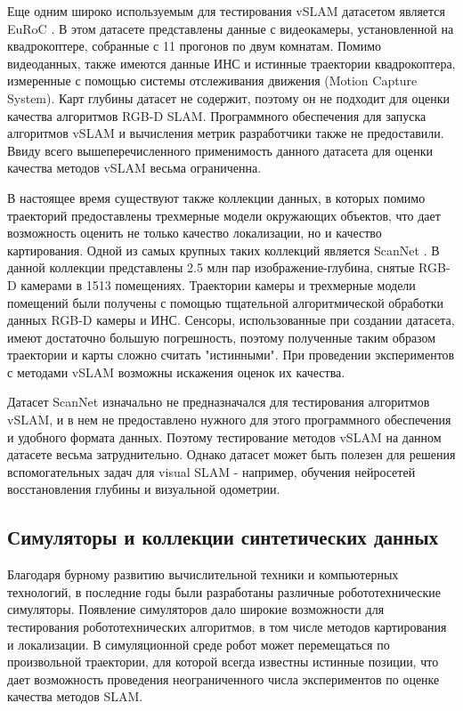 \documentclass{mipt-thesis-ms}
\begin{document}
	Еще одним широко используемым для тестирования vSLAM датасетом является EuRoC \cite{burri2016euroc}. В этом датасете представлены данные с видеокамеры, установленной на квадрокоптере, собранные с 11 прогонов по двум комнатам. Помимо видеоданных, также имеются данные ИНС и истинные траектории квадрокоптера, измеренные с помощью системы отслеживания движения (Motion Capture System). Карт глубины датасет не содержит, поэтому он не подходит для оценки качества алгоритмов RGB-D SLAM. Программного обеспечения для запуска алгоритмов vSLAM и вычисления метрик разработчики также не предоставили. Ввиду всего вышеперечисленного применимость данного датасета для оценки качества методов vSLAM весьма ограниченна.
	
	В настоящее время существуют также коллекции данных, в которых помимо траекторий предоставлены трехмерные модели окружающих объектов, что дает возможность оценить не только качество локализации, но и качество картирования. Одной из самых крупных таких коллекций является ScanNet \cite{dai2017scannet}. В данной коллекции представлены 2.5 млн пар изображение-глубина, снятые RGB-D камерами в 1513 помещениях. Траектории камеры и трехмерные модели помещений были получены с помощью тщательной алгоритмической обработки данных RGB-D камеры и ИНС. Сенсоры, использованные при создании датасета, имеют достаточно большую погрешность, поэтому полученные таким образом траектории и карты сложно считать "истинными". При проведении экспериментов с методами vSLAM возможны искажения оценок их качества.
	
	Датасет ScanNet изначально не предназначался для тестирования алгоритмов vSLAM, и в нем не предоставлено нужного для этого программного обеспечения и удобного формата данных. Поэтому тестирование методов vSLAM на данном датасете весьма затруднительно. Однако датасет может быть полезен для решения вспомогательных задач для visual SLAM - например, обучения нейросетей восстановления глубины и визуальной одометрии.
	
	\subsection{Симуляторы и коллекции синтетических данных}
	
	Благодаря бурному развитию вычислительной техники и компьютерных технологий, в последние годы были разработаны различные робототехнические симуляторы. Появление симуляторов дало широкие возможности для тестирования робототехнических алгоритмов, в том числе методов картирования и локализации. В симуляционной среде робот может перемещаться по произвольной траектории, для которой всегда известны истинные позиции, что дает возможность проведения неограниченного числа экспериментов по оценке качества методов SLAM.
	
\end{document}
